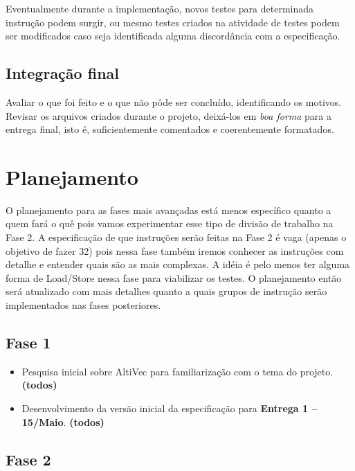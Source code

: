 \documentclass[twocolumn]{article}
\newcommand{\who}[1]{\textbf{ (#1)}}
\begin{document}
Eventualmente durante a implementação, novos testes para determinada instrução
podem surgir, ou mesmo testes criados na atividade de testes podem ser
modificados caso seja identificada alguma discordância com a especificação.


\subsection{Integração final}

Avaliar o que foi feito e o que não pôde ser concluído, identificando os
motivos. Revisar os arquivos criados durante o projeto, deixá-los em \emph{boa
forma} para a entrega final, isto é, suficientemente comentados e coerentemente
formatados.



\section{Planejamento}

O planejamento para as fases mais avançadas está menos específico quanto a quem
fará o quê pois vamos experimentar esse tipo de divisão de trabalho na Fase 2.
A especificação de que instruções serão feitas na Fase 2 é vaga (apenas o
objetivo de fazer 32) pois nessa fase também iremos conhecer as instruções com
detalhe e entender quais são as mais complexas. A idéia é pelo menos ter alguma
forma de Load/Store nessa fase para viabilizar os testes. O planejamento então
será atualizado com mais detalhes quanto a quais grupos de instrução serão
implementados nas fases posteriores.

\subsection{Fase 1}

\begin{itemize}

\item Pesquisa inicial sobre AltiVec para familiarização com o tema do projeto.
\who{todos}

\item Desenvolvimento da versão inicial da especificação para \textbf{Entrega 1
-- 15/Maio}. \who{todos}

\end{itemize}


\subsection{Fase 2}
\end{document}
